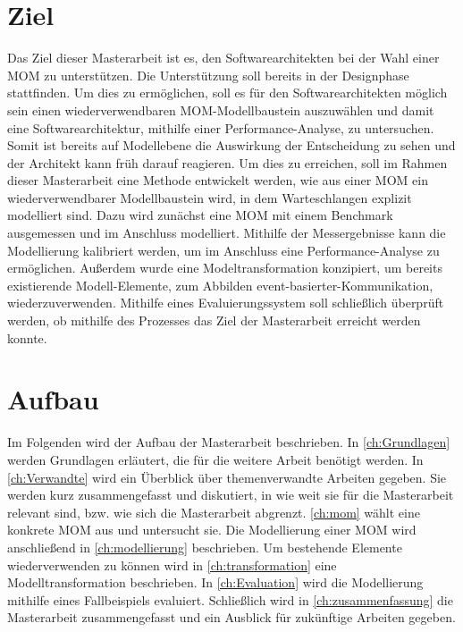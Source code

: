 \section{Ziel}
Das Ziel dieser Masterarbeit ist es, den Softwarearchitekten bei der Wahl einer MOM zu unterstützen. Die Unterstützung soll bereits in der Designphase stattfinden. Um dies zu ermöglichen, soll es für den Softwarearchitekten möglich sein einen wiederverwendbaren MOM-Modellbaustein auszuwählen und damit eine Softwarearchitektur, mithilfe einer Performance-Analyse, zu untersuchen. Somit ist bereits auf Modellebene die Auswirkung der Entscheidung zu sehen und der Architekt kann früh darauf reagieren. Um dies zu erreichen, soll im Rahmen dieser Masterarbeit eine Methode entwickelt werden, wie aus einer MOM ein wiederverwendbarer Modellbaustein wird, in dem Warteschlangen explizit modelliert sind. Dazu wird zunächst eine MOM mit einem Benchmark ausgemessen und im Anschluss modelliert. Mithilfe der Messergebnisse kann die Modellierung kalibriert werden, um im Anschluss eine Performance-Analyse zu ermöglichen. Außerdem wurde eine Modeltransformation konzipiert, um bereits existierende Modell-Elemente, zum Abbilden event-basierter-Kommunikation, wiederzuverwenden. Mithilfe eines Evaluierungssystem soll schließlich überprüft werden, ob mithilfe des Prozesses das Ziel der Masterarbeit erreicht werden konnte.

\section{Aufbau}
Im Folgenden wird der Aufbau der Masterarbeit beschrieben. In \autoref{ch:Grundlagen} werden Grundlagen erläutert, die für die weitere Arbeit benötigt werden. In \autoref{ch:Verwandte} wird ein Überblick über themenverwandte Arbeiten gegeben. Sie werden kurz zusammengefasst und diskutiert, in
wie weit sie für die Masterarbeit relevant sind, bzw. wie sich die Masterarbeit abgrenzt. \autoref{ch:mom} wählt eine konkrete MOM aus und untersucht sie. Die Modellierung einer MOM wird anschließend in \autoref{ch:modellierung} beschrieben. Um bestehende Elemente wiederverwenden zu können wird in \autoref{ch:transformation} eine Modelltransformation beschrieben. In \autoref{ch:Evaluation} wird die Modellierung mithilfe eines Fallbeispiels evaluiert. Schließlich wird in \autoref{ch:zusammenfassung} die Masterarbeit zusammengefasst und ein Ausblick für zukünftige Arbeiten gegeben.


